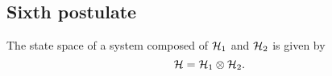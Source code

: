     \subsection{Sixth postulate}
    \begin{postulate}
        The state space of a system composed of $\mathcal{H}_1$ and $\mathcal{H}_2$ is given by
        \begin{equation*}
            \mathcal{H}=\mathcal{H}_1\otimes\mathcal{H}_2.
        \end{equation*}
        \label{post:6}
    \end{postulate}
